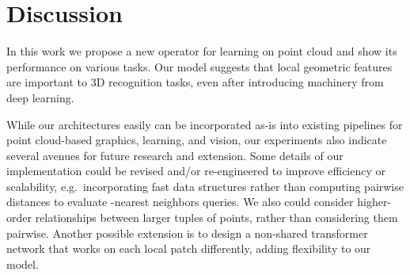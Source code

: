 \documentclass[acmtog]{acmart}
\begin{document}
\begin{table}[h]
\vskip 0.1in
\begin{center}
\end{center}
\caption{3D semantic segmentation results on S3DIS. MS+CU for multi-scale block features with consolidation units; G+RCU for the grid-blocks with recurrent consolidation Units.}
\label{table:sem_seg}
\end{table}










 

\section{Discussion}
In this work we propose a new operator for learning on point cloud and show its performance on various tasks. Our model suggests that local geometric features are important to 3D recognition tasks, even after introducing machinery from deep learning. 

While our architectures easily can be incorporated as-is into existing pipelines for point cloud-based graphics, learning, and vision, our experiments also indicate several avenues for future research and extension. Some details of our implementation could be revised and/or re-engineered to improve efficiency or scalability, e.g.\ incorporating fast data structures rather than computing pairwise distances to evaluate -nearest neighbors queries. We also could consider higher-order relationships between larger tuples of points, rather than considering them pairwise. Another possible extension is to design a non-shared transformer network that works on each local patch differently, adding flexibility to our model.
\end{document}
